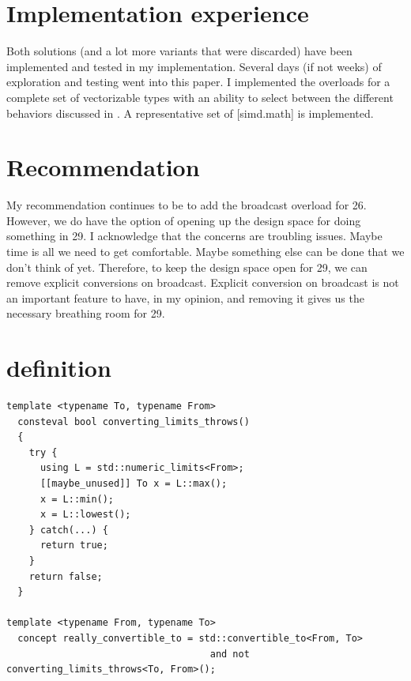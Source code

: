 \section{Implementation experience}
Both solutions (and a lot more variants that were discarded) have been implemented and tested in my
implementation.
Several days (if not weeks) of exploration and testing went into this paper.
I implemented the  overloads for a complete set of vectorizable types with an
ability to select between the different behaviors discussed in \parencite{P3844R1}.
A representative set of [simd.math] is implemented.

\section{Recommendation}

My recommendation continues to be to add the  broadcast overload for \CC{}26.
However, we do have the option of opening up the design space for doing something in \CC{}29.
I acknowledge that the concerns are troubling issues.
Maybe time is all we need to get comfortable.
Maybe something else can be done that we don't think of yet.
Therefore, to keep the design space open for \CC{}29, we can remove explicit conversions on
broadcast.
Explicit conversion on broadcast is not an important feature to have, in my opinion, and removing it
gives us the necessary breathing room for \CC{}29.

%


\appendix
\let\appendix=\relax
\section{ definition}\label{sec:really-convertible}
\medskip\begin{lstlisting}[style=Vc]
template <typename To, typename From>
  consteval bool converting_limits_throws()
  {
    try {
      using L = std::numeric_limits<From>;
      [[maybe_unused]] To x = L::max();
      x = L::min();
      x = L::lowest();
    } catch(...) {
      return true;
    }
    return false;
  }

template <typename From, typename To>
  concept really_convertible_to = std::convertible_to<From, To>
                                    and not converting_limits_throws<To, From>();
\end{lstlisting}



